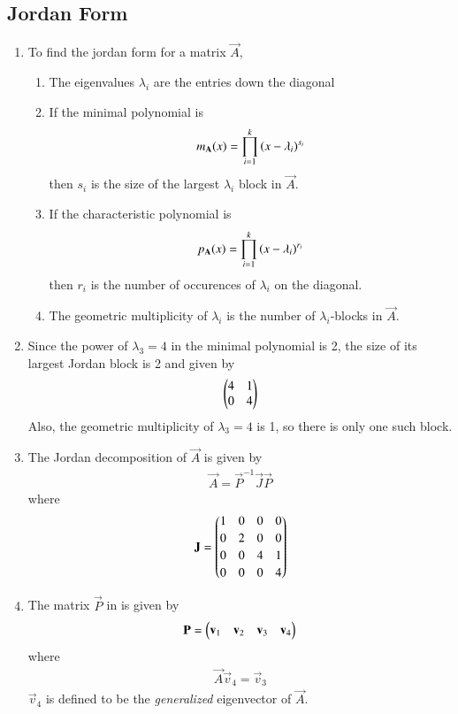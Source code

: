 \subsection{Jordan Form}
\renewcommand{\theequation}{\theenumi}
\renewcommand{\thefigure}{\theenumi}
\begin{enumerate}[label=\thesection.\arabic*.,ref=\thesection.\theenumi]

\item To find the jordan form for a matrix $\vec{A}$,
\begin{enumerate}
\item The eigenvalues $\lambda_i$ are the entries down the diagonal 
\item If the minimal polynomial is
\begin{align}
m_{\mathbf{A}}(x) = \prod_{i=1}^{k}\left(x - \lambda_i\right)^{s_i}
\end{align}
then $s_i$ is the size of the largest $\lambda_i$ block in $\vec{A}$.
\item If the characteristic polynomial is
\begin{align}
p_{\mathbf{A}}(x) = \prod_{i=1}^{k}\left(x - \lambda_i\right)^{r_i}
\end{align}
then $r_i$ is the number of occurences of $\lambda_i$ on the diagonal.
\item The geometric multiplicity of $\lambda_i$ is the number of $\lambda_i$-blocks in $\vec{A}$.
\end{enumerate}
\item Since the power of $\lambda_3 = 4$ in the minimal polynomial is 2, the size of its largest
Jordan block is 2 and given by
\begin{align}
\begin{pmatrix}4 & 1 \\ 0 & 4\end{pmatrix}
\end{align}
Also, the geometric multiplicity of $\lambda_3 = 4$ is 1,  so there is only one such block.
\item The Jordan decomposition of $\vec{A}$ is given by
\begin{align}
\vec{A} = \vec{P}^{-1}\vec{J}\vec{P}
\label{eq:jord_mat}
\end{align}
%
where
%
\begin{align}
\mathbf{J} = 
\begin{pmatrix}
  1 &  0 &  0 &  0 \\[2pt]
  0 &  2 & 0 & 0 \\[2pt]
 0 & 0 &  4 &  1 \\[2pt]
  0 &  0 & 0 &  4
\end{pmatrix}
\label{eq:diag_exam_jord_mat}
\end{align}
\item The matrix $\vec{P}$ in \label{eq:exam_jord_mat} is given by 
\begin{align}
\mathbf{P} = \begin{pmatrix}\mathbf{v}_1 & \mathbf{v}_2 & \mathbf{v}_3 & \mathbf{v}_4 \end{pmatrix}
\end{align}
%
where 
\begin{align}
\vec{A}\vec{v}_4 = \vec{v}_3   
\end{align}
$\vec{v}_4$ is defined to be the {\em generalized} eigenvector of $\vec{A}$.
\end{enumerate}
